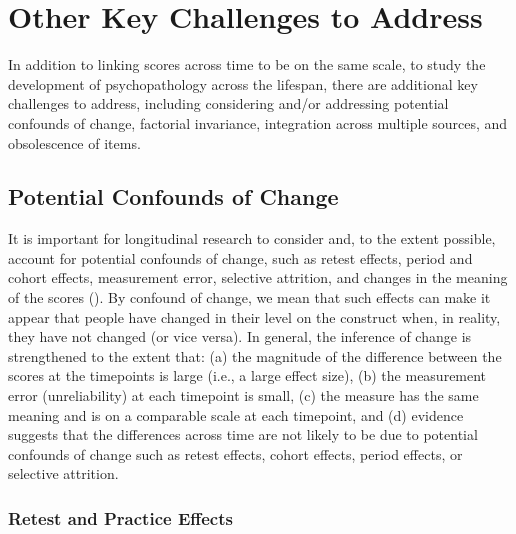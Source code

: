 \documentclass[
  american,
  letterpaper,
  12pt]{article}
\begin{document}
\section{Other Key Challenges to
Address}\label{other-key-challenges-to-address}

In addition to linking scores across time to be on the same scale, to
study the development of psychopathology across the lifespan, there are
additional key challenges to address, including considering and/or
addressing potential confounds of change, factorial invariance,
integration across multiple sources, and obsolescence of items.

\subsection{Potential Confounds of
Change}\label{sec-potential-confounds-of-change}

It is important for longitudinal research to consider and, to the extent
possible, account for potential confounds of change, such as retest
effects, period and cohort effects, measurement error, selective
attrition, and changes in the meaning of the scores
(). By confound
of change, we mean that such effects can make it appear that people have
changed in their level on the construct when, in reality, they have not
changed (or vice versa). In general, the inference of change is
strengthened to the extent that: (a) the magnitude of the difference
between the scores at the timepoints is large (i.e., a large effect
size), (b) the measurement error (unreliability) at each timepoint is
small, (c) the measure has the same meaning and is on a comparable scale
at each timepoint, and (d) evidence suggests that the differences across
time are not likely to be due to potential confounds of change such as
retest effects, cohort effects, period effects, or selective attrition.

\subsubsection{Retest and Practice
Effects}\label{retest-and-practice-effects}
\end{document}
